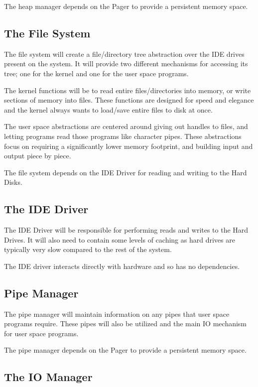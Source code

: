 \documentclass[a4paper]{report}
\begin{document}
The heap manager depends on the Pager to provide a persistent memory space.

\subsection{The File System}

The file system will create a file/directory tree abstraction over the IDE drives present on the system. It will provide two different mechanisms for accessing its tree; one for the kernel and one for the user space programs.

The kernel functions will be to read entire files/directories into memory, or write sections of memory into files. These functions are designed for speed and elegance and the kernel always wants to load/save entire files to disk at once.

The user space abstractions are centered around giving out handles to files, and letting programs read those programs like character pipes. These abstractions focus on requiring a significantly lower memory footprint, and building input and output piece by piece.

The file system depends on the IDE Driver for reading and writing to the Hard Disks.

\subsection{The IDE Driver}

The IDE Driver will be responsible for performing reads and writes to the Hard Drives. It will also need to contain some levels of caching as hard drives are typically very slow compared to the rest of the system.

The IDE driver interacts directly with hardware and so has no dependencies.

\subsection{Pipe Manager}

The pipe manager will maintain information on any pipes that user space programs require. These pipes will also be utilized and the main IO mechanism for user space programs.

The pipe manager depends on the Pager to provide a persistent memory space.

\subsection{The IO Manager}
\end{document}
